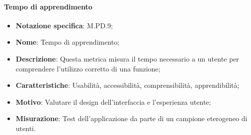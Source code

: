 \paragraph*{Tempo di apprendimento}
\begin{itemize}
    \item \textbf{Notazione specifica}: M.PD.9;
    \item \textbf{Nome}: Tempo di apprendimento;
    \item \textbf{Descrizione}: Questa metrica misura il tempo necessario a un utente per comprendere l'utilizzo corretto di una funzione;
    \item \textbf{Caratteristiche}: Usabilità, accessibilità, comprensibilità, apprendibilità;
    \item \textbf{Motivo}: Valutare il design dell'interfaccia e l'esperienza utente;
    \item \textbf{Misurazione}: Test dell'applicazione da parte di un campione eterogeneo di utenti.
\end{itemize}